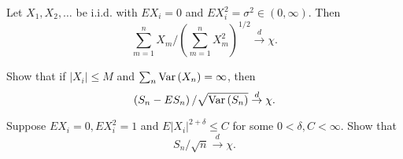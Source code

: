 \begin{exercise}
	Let $X_{1},X_{2},\ldots$ be i.i.d. with $EX_{i}=0$ and $EX_{i}^{2}=\sigma^{2}\in(0,\infty)$. Then
	\begin{equation*}
		\sum_{m=1}^{n}X_{m}/\left(\sum_{m=1}^{n}X_{m}^{2}\right)^{1/2}\stackrel{d}{\rightarrow}\chi.
	\end{equation*}
\end{exercise}

\begin{exercise}
	Show that if $\left|X_{i}\right|\leq M$ and $\sum_{n}\mathrm{Var}\left(X_{n}\right)=\infty$, then
	\begin{equation*}
		\left(S_{n}-E S_{n}\right)/\sqrt{\mathrm{Var}\left(S_{n}\right)}\stackrel{d}{\rightarrow}\chi.
	\end{equation*}
\end{exercise}

\begin{exercise}
	Suppose $EX_{i}=0,EX_{i}^{2}=1$ and $E\left|X_{i}\right|^{2+\delta}\leq C$ for some $0<\delta,C<\infty$. Show that
	\begin{equation*}
		S_{n}/\sqrt{n}\stackrel{d}{\rightarrow}\chi.
	\end{equation*}
\end{exercise}
